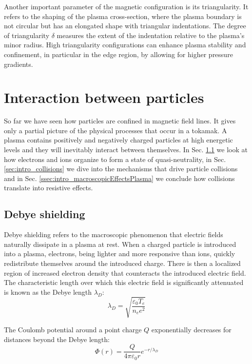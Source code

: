Another important parameter of the magnetic configuration is its triangularity. It refers to the shaping of the plasma cross-section, where the plasma boundary is not circular but has an elongated shape with triangular indentations. The degree of triangularity $\delta$ measures the extent of the indentation relative to the plasma’s minor radius. High triangularity configurations can enhance plasma stability and confinement, in particular in the edge region, by allowing for higher pressure gradients.



\section{Interaction between particles}
\label{sec:intro_particlesInteration}
So far we have seen how particles are confined in magnetic field lines. It gives only a partial picture of the physical processes that occur in a tokamak. A plasma contains positively and negatively charged particles at high energetic levels and they will inevitably interact between themselves. In Sec. \ref{ssec:intro_DebyeShielding} we look at how electrons and ions organize to form a state of quasi-neutrality, in Sec. \ref{sec:intro_collisions} we dive into the mechanisms that drive particle collisions and in Sec. \ref{ssec:intro_macroscopicEffectsPlasma} we conclude how collisions translate into resistive effects.

\subsection{Debye shielding}
\label{ssec:intro_DebyeShielding}
Debye shielding refers to the macroscopic phenomenon that electric fields naturally dissipate in a plasma at rest. When a charged particle is introduced into a plasma, electrons, being lighter and more responsive than ions, quickly redistribute themselves around the introduced charge. There is then a localized region of increased electron density that counteracts the introduced electric field. The characteristic length over which this electric field is significantly attenuated is known as the Debye length $\lambda_D$:
\begin{equation}
	\label{eq:1_DebyeLength}
	\lambda_D = \sqrt{\frac{\varepsilon_0T_e}{n_ee^2}}
\end{equation}

The Coulomb potential around a point charge $Q$ exponentially decreases for distances beyond the Debye length:
\begin{equation}
	\label{eq:1_CoulombPotential}
	\Phi(r) = \frac{Q}{4\pi\varepsilon_0r}e^{-r/\lambda_D}
\end{equation}

